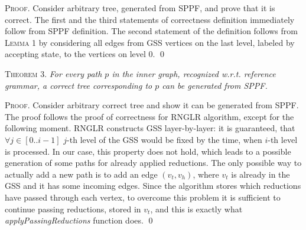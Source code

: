 \textsc{Proof.} Consider arbitrary tree, generated from SPPF, and prove that it is correct. The first and the third statements
of correctness definition immediately follow from SPPF definition. The second statement of the definition follows from \textsc{Lemma 1} 
by considering all edges from GSS vertices on the last level, labeled by accepting state, to the vertices on level 0.
\qed

\textsc{Theorem 3.} 
\textit{For every path $p$ in the inner graph, recognized w.r.t. reference grammar, a correct tree corresponding to $p$ can 
be generated from SPPF.}

\textsc{Proof.}
Consider arbitrary correct tree and show it can be generated from SPPF. The proof follows the proof of correctness 
for RNGLR algorithm, except for the following moment. RNGLR constructs GSS layer-by-layer: it is guaranteed, that $\forall j \in [0..i-1]$ 
$j$-th level of the GSS would be fixed by the time, when $i$-th level is processed. In our case, 
this property does not hold, which leads to a possible generation of some paths for already applied reductions. 
The only possible way to actually add a new path is to add an edge $(v_{t}, v_{h})$, where $v_{t}$ is already in the GSS and 
it has some incoming edges. Since the algorithm stores which reductions have passed through each vertex, to overcome this problem 
it is sufficient to continue passing reductions, stored in $v_{t}$, and this is exactly what \emph{applyPassingReductions} 
function does. 
\qed
